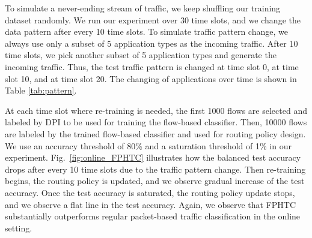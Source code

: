 To simulate a never-ending stream of traffic, we keep shuffling our training dataset randomly. We run our experiment over 30 time slots, and we change the data pattern after every 10 time slots. To simulate traffic pattern change, we always use only a subset of 5 application types as the incoming traffic. After 10 time slots, we pick another subset of 5 application types and generate the incoming traffic. Thus, the test traffic pattern is changed at time slot 0, at time slot 10, and at time slot 20. The changing of applications over time is shown in Table \ref{tab:pattern}. 

At each time slot where re-training is needed, the first 1000 flows are selected and labeled by DPI to be used for training the flow-based classifier. Then, 10000 flows are labeled by the trained flow-based classifier and used for routing policy design. We use an accuracy threshold of 80\% and a saturation threshold of 1\% in our experiment. Fig.~\ref{fig:online_FPHTC} illustrates how the balanced test accuracy drops after every 10 time slots due to the traffic pattern change. Then re-training begins, the routing policy is updated, and we observe gradual increase of the test accuracy. Once the test accuracy is saturated, the routing policy update stops, and we observe a flat line in the test accuracy. Again, we observe that FPHTC substantially outperforms regular packet-based traffic classification in the online setting.